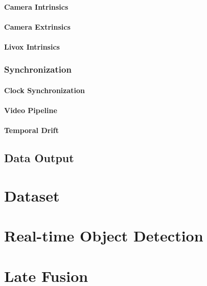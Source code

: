 \documentclass{erauthesis}
\begin{document}
            \subsubsection{Camera Intrinsics}
            
            \subsubsection{Camera Extrinsics}
            
            \subsubsection{Livox Intrinsics}
            
        \subsection{Synchronization}
        
            \subsubsection{Clock Synchronization}
            
            \subsubsection{Video Pipeline}
            
            \subsubsection{Temporal Drift}
            
    \section{Data Output}

\chapter{Dataset}

\chapter{Real-time Object Detection}

\chapter{Late Fusion}
\end{document}
